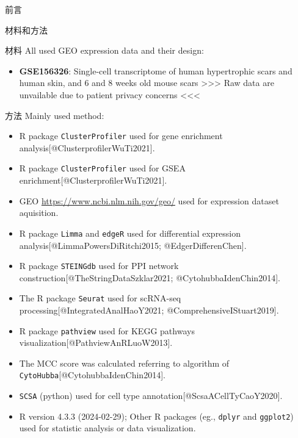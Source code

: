 \documentclass[
  ignorenonframetext,
]{beamer}
\providecommand{\tightlist}{%
  \setlength{\itemsep}{0pt}\setlength{\parskip}{0pt}}
\begin{document}
\begin{frame}{前言}
\protect\hypertarget{introduction}{}
\end{frame}

\begin{frame}[fragile]{材料和方法}
\protect\hypertarget{methods}{}
\begin{block}{材料}
\protect\hypertarget{ux6750ux6599}{}
All used GEO expression data and their design:

\begin{itemize}
\tightlist
\item
  \textbf{GSE156326}: Single-cell transcriptome of human hypertrophic
  scars and human skin, and 6 and 8 weeks old mouse scars
  \textgreater\textgreater\textgreater{} Raw data are unvailable due to
  patient privacy concerns \textless\textless\textless{}
\end{itemize}
\end{block}

\begin{block}{方法}
\protect\hypertarget{ux65b9ux6cd5}{}
Mainly used method:

\begin{itemize}
\tightlist
\item
  R package \texttt{ClusterProfiler} used for gene enrichment
  analysis{[}@ClusterprofilerWuTi2021{]}.
\item
  R package \texttt{ClusterProfiler} used for GSEA
  enrichment{[}@ClusterprofilerWuTi2021{]}.
\item
  GEO \url{https://www.ncbi.nlm.nih.gov/geo/} used for expression
  dataset aquisition.
\item
  R package \texttt{Limma} and \texttt{edgeR} used for differential
  expression analysis{[}@LimmaPowersDiRitchi2015; @EdgerDifferenChen{]}.
\item
  R package \texttt{STEINGdb} used for PPI network
  construction{[}@TheStringDataSzklar2021; @CytohubbaIdenChin2014{]}.
\item
  The R package \texttt{Seurat} used for scRNA-seq
  processing{[}@IntegratedAnalHaoY2021; @ComprehensiveIStuart2019{]}.
\item
  R package \texttt{pathview} used for KEGG pathways
  visualization{[}@PathviewAnRLuoW2013{]}.
\item
  The MCC score was calculated referring to algorithm of
  \texttt{CytoHubba}{[}@CytohubbaIdenChin2014{]}.
\item
  \texttt{SCSA} (python) used for cell type
  annotation{[}@ScsaACellTyCaoY2020{]}.
\item
  R version 4.3.3 (2024-02-29); Other R packages (eg., \texttt{dplyr}
  and \texttt{ggplot2}) used for statistic analysis or data
  visualization.
\end{itemize}
\end{block}
\end{frame}
\end{document}
